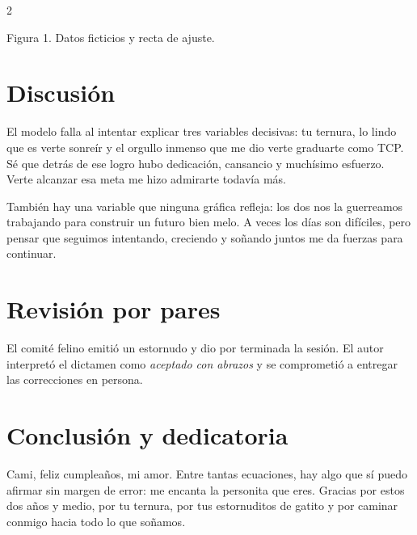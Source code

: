 \documentclass[10pt,letterpaper]{article}
\begin{document}
\begin{multicols}{2}
\begin{center}
\begin{minipage}{\columnwidth}
\centering
{}
\par\footnotesize\color{muted} Figura 1. Datos ficticios y recta de ajuste.
\end{minipage}
\end{center}

\section{Discusión}
El modelo falla al intentar explicar tres variables decisivas: tu ternura, lo lindo que es verte sonreír y el orgullo inmenso que me dio verte graduarte como TCP. Sé que detrás de ese logro hubo dedicación, cansancio y muchísimo esfuerzo. Verte alcanzar esa meta me hizo admirarte todavía más.

También hay una variable que ninguna gráfica refleja: los dos nos la guerreamos trabajando para construir un futuro bien melo. A veces los días son difíciles, pero pensar que seguimos intentando, creciendo y soñando juntos me da fuerzas para continuar.

\section{Revisión por pares}
El comité felino emitió un estornudo y dio por terminada la sesión. El autor interpretó el dictamen como \emph{aceptado con abrazos} y se comprometió a entregar las correcciones en persona.

\section{Conclusión y dedicatoria}
Cami, feliz cumpleaños, mi amor. Entre tantas ecuaciones, hay algo que sí puedo afirmar sin margen de error: me encanta la personita que eres. Gracias por estos dos años y medio, por tu ternura, por tus estornuditos de gatito y por caminar conmigo hacia todo lo que soñamos.


\end{multicols}
\end{document}
